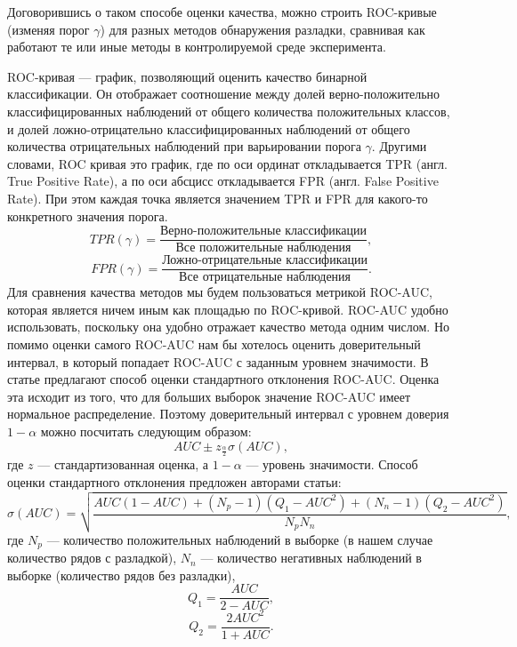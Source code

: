\documentclass[%
12pt,
master,  %
natbib,      %
subf,        %
substylefile = spbu.rtx,
href,        %
colorlinks,  %
]{disser}
\begin{document}
Договорившись о таком способе оценки качества, можно строить ROC-кривые (изменяя порог $\gamma$) для разных методов обнаружения разладки, сравнивая как работают те или иные методы в контролируемой среде эксперимента.

ROC-кривая --- график, позволяющий оценить качество бинарной классификации. Он отображает соотношение между долей верно-положительно классифицированных наблюдений от общего количества положительных классов, и долей ложно-отрицательно классифицированных наблюдений от общего количества отрицательных наблюдений при варьировании порога $\gamma$.
Другими словами, ROC кривая это график, где по оси ординат откладывается TPR (англ. True Positive Rate), а по оси абсцисс откладывается FPR (англ. False Positive Rate). При этом каждая точка является значением TPR и FPR для какого-то конкретного значения порога.
\begin{equation*}
TPR (\gamma) = \frac{\text{Верно-положительные классификации}}{\text{Все положительные наблюдения}},
\end{equation*}
\begin{equation*} 
FPR(\gamma) = \frac{\text{Ложно-отрицательные классификации}}{\text{Все отрицательные наблюдения}}.
\end{equation*}
Для сравнения качества методов мы будем пользоваться метрикой ROC-AUC, которая является ничем иным как площадью по ROC-кривой. ROC-AUC удобно использовать, поскольку она удобно отражает качество метода одним числом. Но помимо оценки самого ROC-AUC нам бы хотелось оценить доверительный интервал, в который попадает ROC-AUC с заданным уровнем значимости. В статье \cite{roc-confidence} предлагают способ оценки стандартного отклонения ROC-AUC. Оценка эта исходит из того, что для больших выборок значение ROC-AUC имеет нормальное распределение. Поэтому доверительный интервал с уровнем доверия $1 - \alpha$ можно посчитать следующим образом:
\begin{equation*}
AUC \pm z_{\frac{\alpha}{2}} \sigma(AUC),
\end{equation*}
где $z$ --- стандартизованная оценка, а $1 - \alpha$ --- уровень значимости.
Способ оценки стандартного отклонения предложен авторами статьи:
\begin{equation*}
\sigma(AUC) = \sqrt{\frac{AUC(1 - AUC) + (N_p - 1)(Q_1 - AUC^2) + (N_n-1)(Q_2 - AUC^2)}{N_pN_n}}, \end{equation*}
где $N_p$ --- количество положительных наблюдений в выборке (в нашем случае количество рядов с разладкой), $N_n$ --- количество негативных наблюдений в выборке (количество рядов без разладки),
\begin{equation*} 
Q_1 = \frac{AUC}{2 - AUC},
\end{equation*}
\begin{equation*}
Q_2 = \frac{2AUC^2}{1 + AUC}.
\end{equation*}
\end{document}
